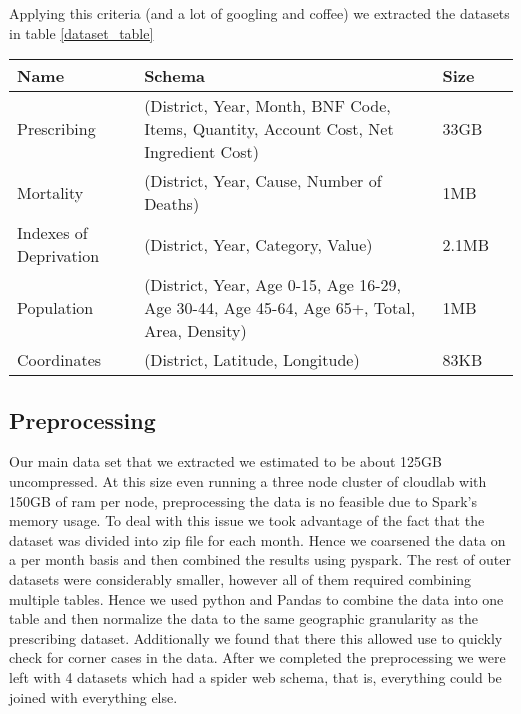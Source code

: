 \documentclass[a4paper]{article}
\begin{document}
		Applying this criteria (and a lot of googling and coffee) we extracted the datasets in table \ref{dataset_table}
		\begin{table*}
		\scriptsize
		\begin{tabular}{|l|l|l|c|}
			\hline
			Name & Schema & Size \\
			\hline
			Prescribing & (District, Year, Month, BNF Code,  Items, Quantity, Account Cost, Net Ingredient Cost) & 33GB\\
			\hline 
			Mortality & (District, Year, Cause, Number of Deaths) & 1MB \\
			\hline
			Indexes of Deprivation & (District, Year,  Category, Value) &  2.1MB \\
			\hline
			Population & (District, Year,  Age 0-15, Age 16-29, Age 30-44, Age 45-64, Age 65+, Total, Area, Density) & 1MB\\
			\hline
			Coordinates & (District, Latitude, Longitude) & 83KB \\
			\hline
		\end{tabular}
		\caption{Tables after preprocessing}
		\label{dataset_table}
		\end{table*}





	\subsection{Preprocessing}
		Our main data set that we extracted we estimated to be about 125GB uncompressed. At this size
		even running a three node cluster of cloudlab with 150GB of ram per node, preprocessing the 
		data is no feasible due to Spark's memory usage. To deal with this issue we took advantage 
		of the fact that the dataset was divided into zip file for each month. Hence we coarsened the
		data on a per month basis and then combined the results using pyspark. The rest of outer datasets
		were considerably smaller, however all of them required combining multiple tables. Hence 
		we used python and Pandas to combine the data into one table and then normalize the data to the same geographic 
		granularity as the prescribing dataset. Additionally we found that there this allowed use to quickly check for 
		corner cases in the data. After we completed the preprocessing we were left with 4 datasets which had a 
		spider web schema, that is, everything could be joined with everything else. %
\end{document}
